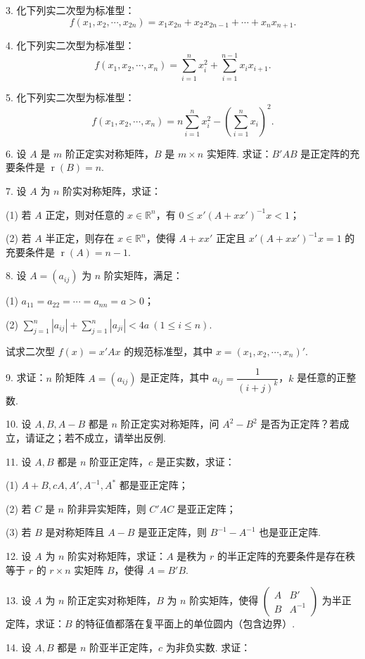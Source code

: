 \documentclass[UTF8, 12pt, fontset=fandol, oneside]{ctexart}
\begin{document}
3. 化下列实二次型为标准型：
\[
f(x_1,x_2,\cdots,x_{2n})=x_1x_{2n}+x_2x_{2n-1}+\cdots+x_nx_{n+1}.
\]

4. 化下列实二次型为标准型：
\[
f(x_1,x_2,\cdots,x_n)=\sum_{i=1}^n x_i^2+\sum_{i=1}^{n-1}x_ix_{i+1}.
\]

5. 化下列实二次型为标准型：
\[
f(x_1,x_2,\cdots,x_n)=n\sum_{i=1}^n x_i^2-\left(\sum_{i=1}^n x_i\right)^2.
\]

6. 设 $A$ 是 $m$ 阶正定实对称矩阵，$B$ 是 $m\times n$ 实矩阵. 求证：$B'AB$ 是正定阵的充要条件是 $\operatorname{r}(B)=n$.

7. 设 $A$ 为 $n$ 阶实对称矩阵，求证：

(1) 若 $A$ 正定，则对任意的 $x\in\mathbb{R}^n$，有 $0\le x'(A+xx')^{-1}x<1$；

(2) 若 $A$ 半正定，则存在 $x\in\mathbb{R}^n$，使得 $A+xx'$ 正定且 $x'(A+xx')^{-1}x=1$ 的充要条件是 $\operatorname{r}(A)=n-1$.

8. 设 $A=(a_{ij})$ 为 $n$ 阶实矩阵，满足：

(1) $a_{11}=a_{22}=\cdots=a_{nn}=a>0$；

(2) $\displaystyle\sum_{j=1}^n |a_{ij}|+\sum_{j=1}^n |a_{ji}|<4a\ (1\le i\le n)$.

试求二次型 $f(x)=x'Ax$ 的规范标准型，其中 $x=(x_1,x_2,\cdots,x_n)'$.

9. 求证：$n$ 阶矩阵 $A=(a_{ij})$ 是正定阵，其中 $a_{ij}=\dfrac1{(i+j)^k}$，$k$ 是任意的正整数.

10. 设 $A,B,A-B$ 都是 $n$ 阶正定实对称矩阵，问 $A^2-B^2$ 是否为正定阵？若成立，请证之；若不成立，请举出反例.

11. 设 $A,B$ 都是 $n$ 阶亚正定阵，$c$ 是正实数，求证：

(1) $A+B,cA,A',A^{-1},A^*$ 都是亚正定阵；

(2) 若 $C$ 是 $n$ 阶非异实矩阵，则 $C'AC$ 是亚正定阵；

(3) 若 $B$ 是对称矩阵且 $A-B$ 是亚正定阵，则 $B^{-1}-A^{-1}$ 也是亚正定阵.

12. 设 $A$ 为 $n$ 阶实对称矩阵，求证：$A$ 是秩为 $r$ 的半正定阵的充要条件是存在秩等于 $r$ 的 $r\times n$ 实矩阵 $B$，使得 $A=B'B$.

13. 设 $A$ 为 $n$ 阶正定实对称矩阵，$B$ 为 $n$ 阶实矩阵，使得 $\left(\begin{array}{cc}A&B'\\ B&A^{-1}\end{array}\right)$ 为半正定阵，求证：$B$ 的特征值都落在复平面上的单位圆内（包含边界）.

14. 设 $A,B$ 都是 $n$ 阶亚半正定阵，$c$ 为非负实数. 求证：
\end{document}
